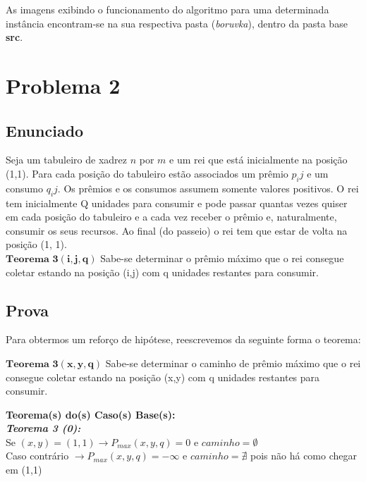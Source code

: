 \documentclass[12pt]{article}
\begin{document}
\indent As imagens exibindo o funcionamento do algoritmo para uma determinada instância encontram-se na sua respectiva pasta (\textit{boruvka}), dentro da pasta base \textbf{src}. 

\section{Problema 2}

\subsection{ Enunciado }
\indent Seja um tabuleiro de xadrez $n$ por $m$ e um rei que está inicialmente na posição (1,1). Para cada posição do tabuleiro estão associados um prêmio $p_ij$ e um consumo $q_ij$. Os prêmios e os consumos assumem somente valores positivos.
O rei tem inicialmente Q unidades para consumir e pode passar quantas vezes quiser em cada
posição do tabuleiro e a cada vez receber o prêmio e, naturalmente, consumir os seus recursos. Ao final (do passeio) o rei tem que estar de volta na posição (1, 1).\\

$\mathbf{Teorema}$ $\mathbf{3}$$\mathbf{(i,j,q)}$ Sabe-se determinar o prêmio máximo que o rei consegue coletar estando na posição (i,j) com q unidades restantes para consumir.\\

\subsection{ Prova }
Para obtermos um reforço de hipótese, reescrevemos da seguinte forma o teorema:

$\mathbf{Teorema}$ $\mathbf{3}$$\mathbf{(x,y,q)}$ Sabe-se determinar o caminho de prêmio máximo que o rei consegue coletar estando na posição (x,y) com q unidades restantes para consumir.\\

\indent 

\textbf{Teorema(s) do(s) Caso(s) Base(s):}\\

\textit{\textbf{Teorema 3 (0):}}\\
Se $ (x,y)=(1,1) \rightarrow P_{max}(x,y,q) = 0$ e $caminho = \emptyset $\\
Caso contrário $\rightarrow P_{max}(x,y,q) = -\infty $ e $caminho = \nexists $ pois não há como chegar em (1,1) \\ 
\end{document}
